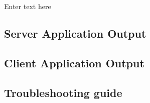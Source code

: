 Enter text here

\subsection{Server Application Output}
\subsection{Client Application Output}
\subsection{Troubleshooting guide}